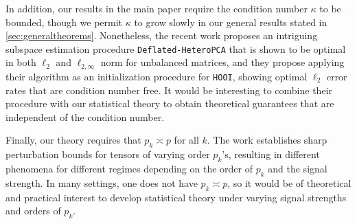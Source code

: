 \documentclass[10pt]{article}
\newcommand{\0}{{\mathbf{0}}}
\newcommand{\1}{{\mathbf{1}}}
\renewcommand{\citet}{\cite}
\begin{document}
In addition, our results in the main paper require the condition number $\kappa$ to be bounded, though we permit $\kappa$ to grow slowly in our general results stated in \cref{sec:generaltheorems}. Nonetheless, the recent work \citet{zhou_deflated_2023} proposes an intriguing subspace estimation procedure \texttt{Deflated-HeteroPCA} that is shown to be optimal in both $\ell_2$ and $\ell_{2,\infty}$ norm for unbalanced matrices, and they propose applying their algorithm as an initialization procedure for \texttt{HOOI}, showing optimal $\ell_2$ error rates that are condition number free.  It would be interesting to combine their procedure with our statistical theory to obtain theoretical guarantees that are independent of the condition number.  

Finally, our theory requires that $p_k \asymp p$ for all $k$.  The work \citet{luo_sharp_2021} establishes sharp perturbation bounds for tensors of varying order $p_k$'s, resulting in different phenomena for different regimes depending on the order of $p_k$ and the signal strength.  In many settings, one does not have $p_k \asymp p$, so it would be of theoretical and practical interest to develop statistical theory under varying  signal strengths and orders of $p_k$.  
\end{document}
